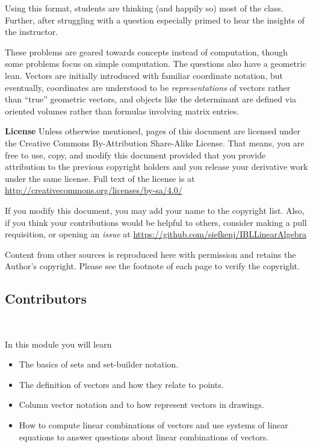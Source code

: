 \documentclass{problemset}
\begin{document}
Using this format, students are thinking (and happily so) most of the class. Further,
after struggling with a question especially primed to hear the insights of the instructor.

These problems are geared towards concepts instead of computation, though some problems
focus on simple computation. The questions also have a geometric lean. Vectors are initially
introduced with familiar coordinate notation, but eventually, coordinates are understood to be
\emph{representations} of vectors rather than ``true'' geometric vectors, and objects like the
determinant are defined via oriented volumes rather than formulas involving matrix entries.

\bigskip
{\bf License} Unless otherwise mentioned, pages of this document are licensed under
the Creative Commons By-Attribution Share-Alike License. That means, you are free
to use, copy, and modify this document provided that you provide attribution to the
previous copyright holders and you release your derivative work under the same license.
Full text of the license is at \url{http://creativecommons.org/licenses/by-sa/4.0/}

If you modify this document, you may add your name to the copyright list. Also,
if you think your contributions would be helpful to others, consider making a
pull requisition, or opening an \emph{issue} at \url{https://github.com/siefkenj/IBLLinearAlgebra}

Content from other sources is reproduced here with permission and retains the
Author's copyright. Please see the footnote of each page to verify the
copyright.

\newpage

\begin{bookonly}
\section*{Contributors}

\newpage
	$\phantom{x}$
	\newpage
\end{bookonly}

\setcounter{page}{1}
\pagestyle{siefken}



\begin{module}

	In this module you will learn
	\begin{itemize}
		\item The basics of sets and set-builder notation.
		\item The definition of vectors and how they relate to points.
		\item Column vector notation and to how represent vectors in drawings.
		\item How to compute linear combinations of vectors and use systems of linear
			equations to answer questions about linear combinations of vectors.
	\end{itemize}

	
\end{module}
\end{document}
